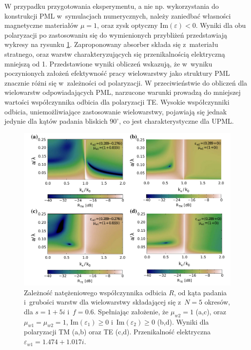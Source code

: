 W przypadku przygotowania eksperymentu, a nie np. wykorzystania do konstrukcji PML w~symulacjach  numerycznych, należy zaniedbać własności magnetyczne materiałów $\mu=1$, oraz zysk optyczny $\textrm{Im}(\varepsilon)<0$. Wyniki dla obu polaryzacji po zastosowaniu się do wymienionych przybliżeń przedstawiają wykresy na rysunku \ref{fig:pml-real-ref}. Zaproponowany absorber składa się z~materiału stratnego, oraz warstw charakteryzujących się przenikalnością elektryczną mniejszą od 1. Przedstawione wyniki obliczeń wskazują, że w~wyniku poczynionych założeń efektywność pracy wielowarstwy jako struktury PML znacznie różni się w~zależności od polaryzacji. W przeciwieństwie do obliczeń dla wielowarstw odpowiadających PML, narzucone warunki prowadzą do mniejszej wartości współczynnika odbicia dla polaryzacji TE. Wysokie współczynniki odbicia, uniemożliwiające zastosowanie wielowarstwy,  pojawiają się jednak jedynie dla kątów padania bliskich $90^{\circ}$, co jest charakterystyczne dla UPML.

\begin{figure}[tb]
	\includegraphics[width=\textwidth]{images/pml/fig5.png}
	\caption{Zależność natężeniowego współczynnika odbicia $R$, od kąta padania i~grubości warstw dla wielowarstwy składającej się z~$N=5$ okresów, dla $s=1+5i$ i~$f=0.6$. Spełniając założenie, że $\mu_{w2}=1$ (a,c), oraz $\mu_{w1}=\mu_{w2}=1$, $\textrm{Im}(\varepsilon_1)\ge 0 $ i~$\textrm{Im}(\varepsilon_2)\ge 0 $ (b,d). Wyniki dla polaryzacji TM (a,b) oraz TE (c,d). Przenikalność elektryczna $\varepsilon_{w1}=1.474+1.017i$.}
	\label{fig:pml-real-ref}
\end{figure}


